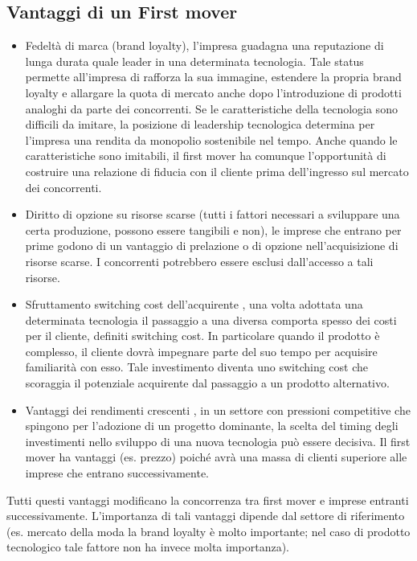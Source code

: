 \documentclass{article}
\begin{document}
\subsection{Vantaggi di un First mover}
\begin{itemize}
\item Fedeltà di marca (brand loyalty), l’impresa guadagna una reputazione di lunga durata quale
leader in una determinata tecnologia. Tale status permette all’impresa di rafforza la sua
immagine, estendere la propria brand loyalty e allargare la quota di mercato anche dopo
l’introduzione di prodotti analoghi da parte dei concorrenti. Se le caratteristiche della
tecnologia sono difficili da imitare, la posizione di leadership tecnologica determina per
l’impresa una rendita da monopolio sostenibile nel tempo. Anche quando le caratteristiche
sono imitabili, il first mover ha comunque l’opportunità di costruire una relazione di fiducia
con il cliente prima dell’ingresso sul mercato dei concorrenti.
\item Diritto di opzione su risorse scarse (tutti i fattori necessari a sviluppare una certa
produzione, possono essere tangibili e non), le imprese che entrano per prime godono di
un vantaggio di prelazione o di opzione nell’acquisizione di risorse scarse. I concorrenti
potrebbero essere esclusi dall’accesso a tali risorse.
\item Sfruttamento switching cost dell’acquirente , una volta adottata una determinata
tecnologia il passaggio a una diversa comporta spesso dei costi per il cliente, definiti
switching cost. In particolare quando il prodotto è complesso, il cliente dovrà impegnare
parte del suo tempo per acquisire familiarità con esso. Tale investimento diventa uno
switching cost che scoraggia il potenziale acquirente dal passaggio a un prodotto
alternativo.
\item Vantaggi dei rendimenti crescenti , in un settore con pressioni competitive che spingono per
l’adozione di un progetto dominante, la scelta del timing degli investimenti nello sviluppo
di una nuova tecnologia può essere decisiva. Il first mover ha vantaggi (es. prezzo) poiché
avrà una massa di clienti superiore alle imprese che entrano successivamente.
\end{itemize}
Tutti questi vantaggi modificano la concorrenza tra first mover e imprese entranti
successivamente. L’importanza di tali vantaggi dipende dal settore di riferimento (es.
mercato della moda la brand loyalty è molto importante; nel caso di prodotto tecnologico
tale fattore non ha invece molta importanza).
\end{document}
